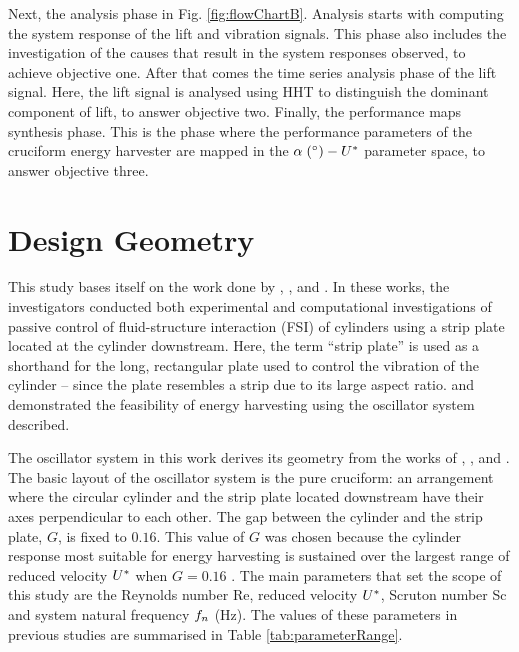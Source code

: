 \documentclass[oneside]{utmthesis}
\begin{document}
 Next, the analysis phase in Fig. \ref{fig:flowChartB}. Analysis starts with computing the system response of the lift and vibration signals. This phase also includes the investigation of the causes that result in the system responses observed, to achieve objective one. After that comes the time series analysis phase of the lift signal. Here, the lift signal is analysed using HHT to distinguish the dominant component of lift, to answer objective two. Finally, the performance maps synthesis phase. This is the phase where the performance parameters of the cruciform energy harvester are mapped in the $\alpha \; (\si{\degree}) - \ured$ parameter space, to answer objective three.

\section{Design Geometry} \label{sec:probGeo}

This study bases itself on the work done by \citet{Koide2013}, \citet{Maruai2017}, and \citet{Maruai2018}. In these works, the investigators conducted both experimental and computational investigations of passive control of fluid-structure interaction (FSI) of cylinders using a strip plate located at the cylinder downstream. Here, the term ``strip plate'' is used as a shorthand for the long, rectangular plate used to control the vibration of the cylinder -- since the plate resembles a strip due to its large aspect ratio. \citet{Koide2013} and \citet{Maruai2018} demonstrated the feasibility of energy harvesting using the oscillator system described.


The oscillator system in this work derives its geometry from the works of \citet{Nguyen2012}, \citet{Koide2013}, and \citet{Koide2017}. The basic layout of the oscillator system is the pure cruciform: an arrangement where the circular cylinder and the strip plate located downstream have their axes perpendicular to each other. The gap between the cylinder and the strip plate, $G$, is fixed to $0.16$. This value of $G$ was chosen because the cylinder response most suitable for energy harvesting is sustained over the largest range of reduced velocity $U^{*}$ when $G = 0.16$ \citep{Koide2013}. The main parameters that set the scope of this study are the Reynolds number Re, reduced velocity $U^{*}$, Scruton number Sc and system natural frequency $f_{n}$ (Hz). The values of these parameters in previous studies are summarised in Table \ref{tab:parameterRange}.
\end{document}
